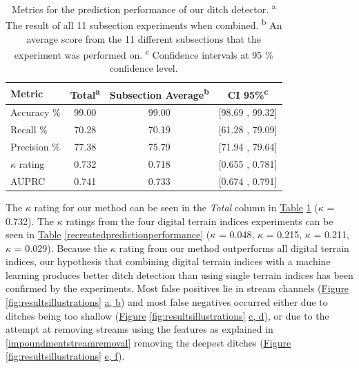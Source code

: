 \documentclass[11pt, review]{elsarticle} %
\begin{document}
\begin{table}[!htb]
\centering
    {\begin{tabular}{l|ccc}
        \textbf{Metric} & \textbf{Total}\textsuperscript{a} & \textbf{Subsection Average}\textsuperscript{b}& \textbf{CI 95\%}\textsuperscript{c} \\ 
        \hline
        Accuracy     \% & 99.00 & 99.00 & [98.69 , 99.32] \\
        Recall       \% & 70.28 & 70.19 & [61.28 , 79.09] \\
        Precision    \% & 77.38 & 75.79 & [71.94 , 79.64] \\
        $\kappa$ rating & 0.732 & 0.718 & [0.655 , 0.781] \\
        AUPRC           & 0.741 & 0.733 & [0.674 , 0.791] \\
        \hline
    \end{tabular}}
    \caption{Metrics for the prediction performance of our ditch detector. \newline
    \textsuperscript{a} The result of all 11 subsection experiments when combined. \newline
    \textsuperscript{b} An average score from the 11 different subsections that the experiment was performed on. \newline
    \textsuperscript{c} Confidence intervals at 95 \% confidence level.}
    \label{predictionperformance}
\end{table}

The $\kappa$ rating for our method can be seen in the \textit{Total} column in \hyperref[predictionperformance]{Table} \ref{predictionperformance} ($\kappa$ = 0.732). The $\kappa$ ratings from the four digital terrain indices experiments can be seen in  \hyperref[recreatedpredictionperformance]{Table} \ref{recreatedpredictionperformance} ($\kappa$ = 0.048, $\kappa$ = 0.215, $\kappa$ = 0.211, $\kappa$ = 0.029). Because the $\kappa$ rating from our method outperforms all digital terrain indices, our hypothesis that combining digital terrain indices with a machine learning produces better ditch detection than using single terrain indices has been confirmed by the experiments. Most false positives lie in stream channels (\hyperref[fig:resultsillustrations]{Figure} \ref{fig:resultsillustrations} \hyperref[fig:resultsillustrations]{a, b}) and most false negatives occurred either due to ditches being too shallow (\hyperref[fig:resultsillustrations]{Figure} \ref{fig:resultsillustrations} \hyperref[fig:resultsillustrations]{c, d}), or due to the attempt at removing streams using the features as explained in \ref{impoundmentstreamremoval} removing the deepest ditches  (\hyperref[fig:resultsillustrations]{Figure} \ref{fig:resultsillustrations} \hyperref[fig:resultsillustrations]{e, f}).
\end{document}
